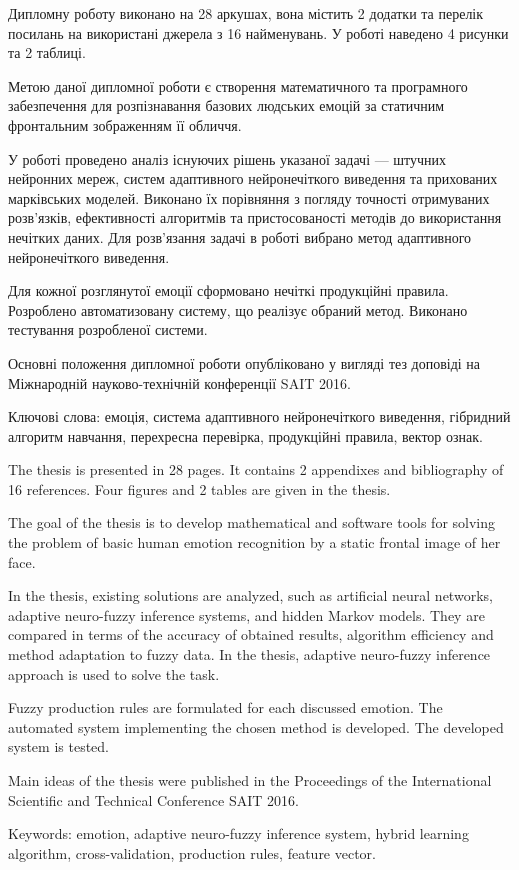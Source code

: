 \abstractUkr


Дипломну роботу виконано на 28 аркушах, вона містить 2 додатки та
перелік посилань на використані джерела з 16 найменувань. У роботі наведено 4
рисунки та 2 таблиці.

Метою даної дипломної роботи є створення математичного та програмного
забезпечення для розпізнавання базових людських емоцій за статичним фронтальним
зображенням її обличчя.

У роботі проведено аналіз існуючих рішень указаної задачі — штучних нейронних
мереж, систем адаптивного нейронечіткого виведення та прихованих марківських
моделей. Виконано їх порівняння з погляду точності отримуваних розв’язків,
ефективності алгоритмів та пристосованості методів до використання нечітких
даних. Для розв’язання задачі в роботі вибрано метод адаптивного нейронечіткого
виведення.

Для кожної розглянутої емоції сформовано нечіткі продукційні правила.
Розроблено автоматизовану систему, що реалізує обраний метод. Виконано
тестування розробленої системи.

Основні положення дипломної роботи опубліковано у вигляді тез доповіді на
Міжнародній науково-технічній конференції SAIT 2016.

Ключові слова: емоція, система адаптивного нейронечіткого виведення, гібридний
алгоритм навчання, перехресна перевірка, продукційні правила, вектор ознак.




\abstractEng


The thesis is presented in 28 pages. It contains 2 appendixes and
bibliography of 16 references. Four figures and 2 tables are given in the
thesis. 

The goal of the thesis is to develop mathematical and software tools for
solving the problem of basic human emotion recognition by a static frontal
image of her face.

In the thesis, existing solutions are analyzed, such as artificial neural
networks, adaptive neuro-fuzzy inference systems, and hidden Markov models.
They are compared in terms of the accuracy of obtained results, algorithm
efficiency and method adaptation to fuzzy data. In the thesis, adaptive
neuro-fuzzy inference approach is used to solve the task.

Fuzzy production rules are formulated for each discussed emotion. The automated
system implementing the chosen method is developed. The developed system is
tested.

Main ideas of the thesis were published in the Proceedings of the International
Scientific and Technical Conference SAIT 2016.

Keywords: emotion, adaptive neuro-fuzzy inference system, hybrid learning
algorithm, cross-validation, production rules, feature vector.
